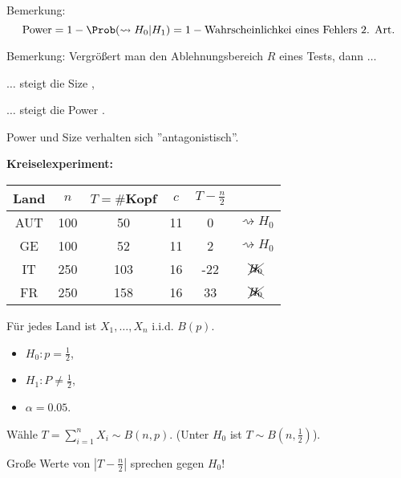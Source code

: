 \documentclass{tstextbook}
\begin{document}
\begin{remark}
	Bemerkung: 
	\[
	\text{Power} = 1-\Prob(\rightsquigarrow H_0|H_1) = 1- \text{Wahrscheinlichkei eines Fehlers 2. Art}.
	\]
\end{remark}

\begin{remark}
	Bemerkung:
	Vergrößert man den Ablehnungsbereich $ R $ eines Tests, dann $\ldots$
	
	$\ldots$ steigt die Size \frownie, 
	
	$\ldots$ steigt die Power \smiley. 
	
	Power und Size verhalten sich ''antagonistisch''.
\end{remark}

\begin{example}
	
	\textbf{Kreiselexperiment:}
	\vspace{0.5cm}
	
\begin{center}
	\begin{tabular}{c|c|c|c|c|c}
		Land 	& $ n $ 	& $ T=\# $Kopf 	& $ c $ 	& $ T-\frac{n}{2} $ 	& \\
		\midrule
		AUT		& 100		& 50 			& 11		& 0						& $ \rightsquigarrow H_0 $ \\
		GE		& 100		& 52 			& 11		& 2						& $ \rightsquigarrow H_0 $ \\
		IT		& 250		& 103 			& 16		& -22					& $ \xcancel{H_0} $ \\
		FR		& 250		& 158 			& 16		& 33					& $ \xcancel{H_0} $ \\
	\end{tabular}
\end{center}
	\vspace{0.5cm}
	
	Für jedes Land ist $ X_1,\ldots,X_n $ i.i.d. $ B(p) $. 
	\begin{itemize}
		\item $ H_0\colon p=\frac{1}{2} $,
		\item $ H_1\colon P\ne \frac{1}{2} $,
		\item $ \alpha = 0.05 $.
	\end{itemize}
	
	Wähle $ T=\sum_{i=1}^{n}X_i \sim B(n,p) $. (Unter $ H_0 $ ist $ T\sim B\left(n,\frac{1}{2}\right) $).
	
	Große Werte von $ |T-\frac{n}{2}| $ sprechen gegen $ H_0 $!
	

\end{example}
\end{document}
